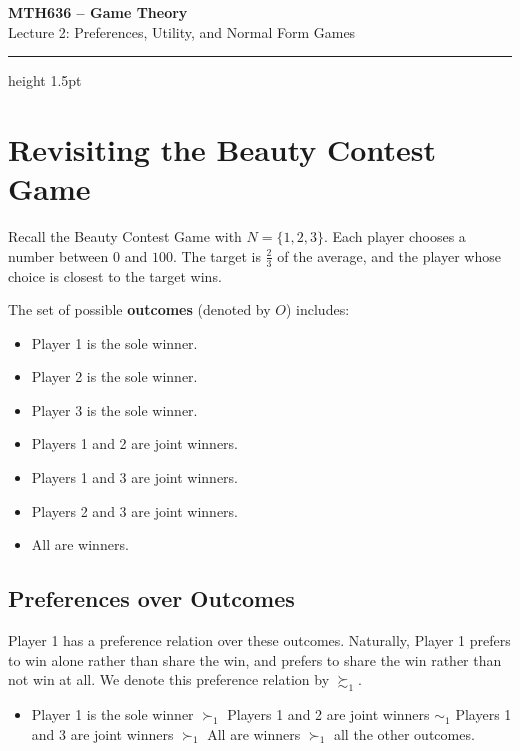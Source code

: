 \documentclass[12pt, a4paper]{article}
\begin{document}
\begin{center}
  {\LARGE\bfseries\sffamily\color{defblue} MTH636 -- Game Theory}\\[6pt]
  {\Large\sffamily Lecture 2: Preferences, Utility, and Normal Form Games}\\[4pt]
\end{center}
\vspace{0.5cm}
\hrule height 1.5pt
\vspace{0.3cm}

\section{Revisiting the Beauty Contest Game}

Recall the Beauty Contest Game with $N = \{1, 2, 3\}$. Each player chooses a number between $0$ and $100$. The target is $\frac{2}{3}$ of the average, and the player whose choice is closest to the target wins.

The set of possible \textbf{outcomes} (denoted by $O$) includes:
\begin{itemize}
    \item Player 1 is the sole winner.
    \item Player 2 is the sole winner.
    \item Player 3 is the sole winner.
    \item Players 1 and 2 are joint winners.
    \item Players 1 and 3 are joint winners.
    \item Players 2 and 3 are joint winners.
    \item All are winners.
\end{itemize}

\subsection{Preferences over Outcomes}
Player 1 has a preference relation over these outcomes. Naturally, Player 1 prefers to win alone rather than share the win, and prefers to share the win rather than not win at all. We denote this preference relation by $\succsim_1$.

\begin{itemize}
    \item Player 1 is the sole winner $\succ_1$ Players 1 and 2 are joint winners $\sim_1$ Players 1 and 3 are joint winners $\succ_1$ All are winners $\succ_1$ all the other outcomes.
\end{itemize}
\end{document}

